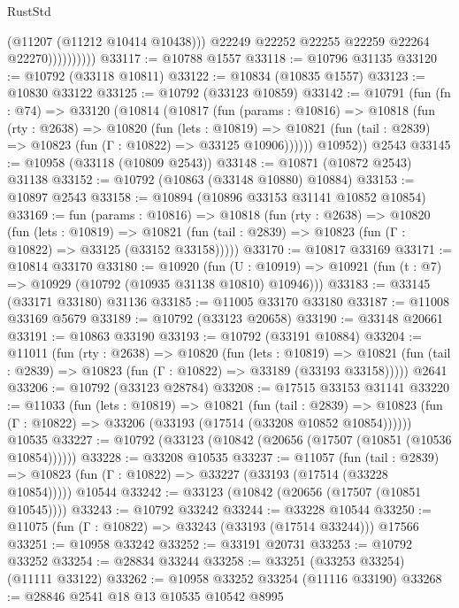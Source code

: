 \begin{lexlean}{RustStd}
\begin{coremodule}
                          (@11207 (@11212 @10414 @10438)))
                        @22249
                        @22252
                        @22255
                        @22259
                        @22264
                        @22270))))))))))
@33117 := @10788 @1557
@33118 := @10796 @31135
@33120 := @10792 (@33118 @10811)
@33122 := @10834 (@10835 @1557)
@33123 := @10830 @33122
@33125 := @10792 (@33123 @10859)
@33142 := @10791
    (fun (fn : @74) =>
    @33120
      (@10814
        (@10817
          (fun (params : @10816) =>
          @10818
            (fun (rty : @2638) =>
            @10820
              (fun (lets : @10819) =>
              @10821 (fun (tail : @2839) => @10823 (fun (Γ : @10822) => @33125 @10906))))))
        @10952))
    @2543
@33145 := @10958 (@33118 (@10809 @2543))
@33148 := @10871 (@10872 @2543) @31138
@33152 := @10792 (@10863 (@33148 @10880) @10884)
@33153 := @10897 @2543
@33158 := @10894 (@10896 @33153 @31141 @10852 @10854)
@33169 := fun (params : @10816) =>
  @10818
    (fun (rty : @2638) =>
    @10820
      (fun (lets : @10819) =>
      @10821 (fun (tail : @2839) => @10823 (fun (Γ : @10822) => @33125 (@33152 @33158)))))
@33170 := @10817 @33169
@33171 := @10814 @33170
@33180 := @10920
    (fun (U : @10919) => @10921 (fun (t : @7) => @10929 (@10792 (@10935 @31138 @10810) @10946)))
@33183 := @33145 (@33171 @33180) @31136
@33185 := @11005 @33170 @33180
@33187 := @11008 @33169 @5679
@33189 := @10792 (@33123 @20658)
@33190 := @33148 @20661
@33191 := @10863 @33190
@33193 := @10792 (@33191 @10884)
@33204 := @11011
    (fun (rty : @2638) =>
    @10820
      (fun (lets : @10819) =>
      @10821 (fun (tail : @2839) => @10823 (fun (Γ : @10822) => @33189 (@33193 @33158)))))
    @2641
@33206 := @10792 (@33123 @28784)
@33208 := @17515 @33153 @31141
@33220 := @11033
    (fun (lets : @10819) =>
    @10821
      (fun (tail : @2839) =>
      @10823 (fun (Γ : @10822) => @33206 (@33193 (@17514 (@33208 @10852 @10854))))))
    @10535
@33227 := @10792 (@33123 (@10842 (@20656 (@17507 (@10851 (@10536 @10854))))))
@33228 := @33208 @10535
@33237 := @11057
    (fun (tail : @2839) => @10823 (fun (Γ : @10822) => @33227 (@33193 (@17514 (@33228 @10854)))))
    @10544
@33242 := @33123 (@10842 (@20656 (@17507 (@10851 @10545))))
@33243 := @10792 @33242
@33244 := @33228 @10544
@33250 := @11075 (fun (Γ : @10822) => @33243 (@33193 (@17514 @33244))) @17566
@33251 := @10958 @33242
@33252 := @33191 @20731
@33253 := @10792 @33252
@33254 := @28834 @33244
@33258 := @33251 (@33253 @33254) (@11111 @33122)
@33262 := @10958 @33252 @33254 (@11116 @33190)
@33268 := @28846 @2541 @18 @13 @10535 @10542 @8995

\end{coremodule}
\end{lexlean}
